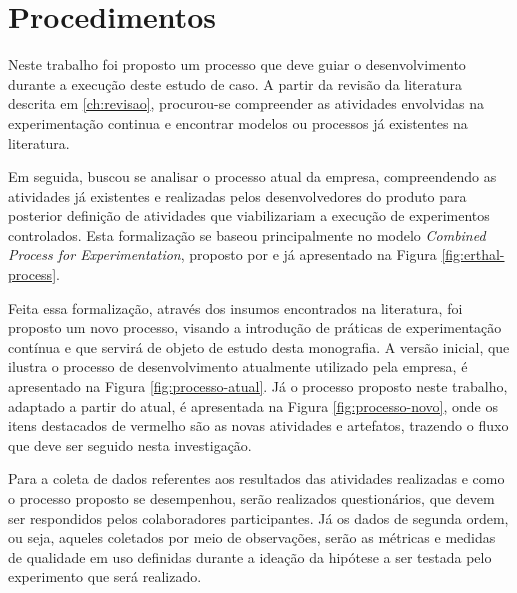 \section{Procedimentos}
\label{sec:procedimentos}

Neste trabalho foi proposto um processo que deve guiar o desenvolvimento durante a execução deste estudo de caso. A partir da revisão da literatura descrita em \ref{ch:revisao}, procurou-se compreender as atividades envolvidas na experimentação continua e encontrar modelos ou processos já existentes na literatura. 

Em seguida, buscou se analisar o processo atual da empresa, compreendendo as atividades já existentes e realizadas pelos desenvolvedores do produto para posterior definição de atividades que viabilizariam a execução de experimentos controlados. Esta formalização se baseou principalmente no modelo \textit{Combined Process for Experimentation}, proposto por  e já apresentado na Figura \ref{fig:erthal-process}.

Feita essa formalização, através dos insumos encontrados na literatura, foi proposto um novo processo, visando a introdução de práticas de experimentação contínua e que servirá de objeto de estudo desta monografia. A versão inicial, que ilustra o processo de desenvolvimento atualmente utilizado pela empresa, é apresentado na Figura \ref{fig:processo-atual}. Já o processo proposto neste trabalho, adaptado a partir do atual, é apresentada na Figura \ref{fig:processo-novo}, onde os itens destacados de vermelho são as novas atividades e artefatos, trazendo o fluxo que deve ser seguido nesta investigação.

Para a coleta de dados referentes aos resultados das atividades realizadas e como o processo proposto se desempenhou, serão realizados questionários, que devem ser respondidos pelos colaboradores participantes. Já os dados de segunda ordem, ou seja, aqueles coletados por meio de observações, serão as métricas e medidas de qualidade em uso definidas durante a ideação da hipótese a ser testada pelo experimento que será realizado.


